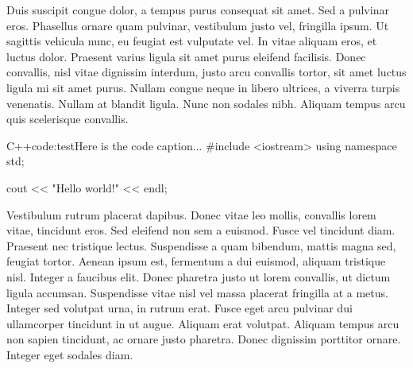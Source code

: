 Duis suscipit congue dolor, a tempus purus consequat sit amet. Sed a pulvinar eros. Phasellus ornare quam pulvinar, vestibulum justo vel, fringilla ipsum. Ut sagittis vehicula nunc, eu feugiat est vulputate vel. In vitae aliquam eros, et luctus dolor. Praesent varius ligula sit amet purus eleifend facilisis. Donec convallis, nisl vitae dignissim interdum, justo arcu convallis tortor, sit amet luctus ligula mi sit amet purus. Nullam congue neque in libero ultrices, a viverra turpis venenatis. Nullam at blandit ligula. Nunc non sodales nibh. Aliquam tempus arcu quis scelerisque convallis.
\begin{code}{C++}{code:test}{Here is the code caption...}
	#include <iostream>
	using namespace std;

	cout << "Hello world!" << endl;
\end{code}

Vestibulum rutrum placerat dapibus. Donec vitae leo mollis, convallis lorem vitae, tincidunt eros. Sed eleifend non sem a euismod. Fusce vel tincidunt diam. Praesent nec tristique lectus. Suspendisse a quam bibendum, mattis magna sed, feugiat tortor. Aenean ipsum est, fermentum a dui euismod, aliquam tristique nisl. Integer a faucibus elit. Donec pharetra justo ut lorem convallis, ut dictum ligula accumsan. Suspendisse vitae nisl vel massa placerat fringilla at a metus. Integer sed volutpat urna, in rutrum erat. Fusce eget arcu pulvinar dui ullamcorper tincidunt in ut augue. Aliquam erat volutpat. Aliquam tempus arcu non sapien tincidunt, ac ornare justo pharetra. Donec dignissim porttitor ornare. Integer eget sodales diam.
